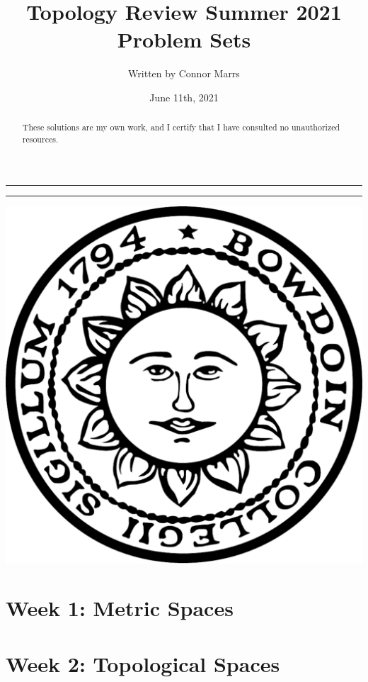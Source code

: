 \documentclass{article}
\title{Topology Review Summer 2021\\Problem Sets}
\date{June 11th, 2021}
\author{Written by Connor Marrs}
\newcommand{\<}{\langle}
\renewcommand{\>}{\rangle}
\theoremstyle{definition}
\begin{document}
\begin{titlepage}
\maketitle
\noindent\rule{\textwidth}{1pt}
\begin{abstract}
    These solutions are my own work, and I certify that I have consulted no unauthorized resources.
\end{abstract} 
\noindent\rule{\textwidth}{1pt}

\begin{center}
    \includegraphics[scale = 0.15]{../images/Bowdoin_Seal.png}
\end{center}

\end{titlepage}


\maketitle

\section{Week 1: Metric Spaces}


\section{Week 2: Topological Spaces}

\end{document}
